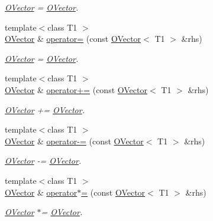 \begin{DoxyCompactItemize}
\begin{DoxyCompactList}\small\item\em \mbox{\hyperlink{classENSEM_1_1OVector}{O\+Vector}} = \mbox{\hyperlink{classENSEM_1_1OVector}{O\+Vector}}. \end{DoxyCompactList}\item 
{\footnotesize template$<$class T1 $>$ }\\\mbox{\hyperlink{classENSEM_1_1OVector}{O\+Vector}} \& \mbox{\hyperlink{classENSEM_1_1OVector_a7d5f2f5a6c1dc742f53cc4dabc86722e}{operator=}} (const \mbox{\hyperlink{classENSEM_1_1OVector}{O\+Vector}}$<$ T1 $>$ \&rhs)
\begin{DoxyCompactList}\small\item\em \mbox{\hyperlink{classENSEM_1_1OVector}{O\+Vector}} = \mbox{\hyperlink{classENSEM_1_1OVector}{O\+Vector}}. \end{DoxyCompactList}\item 
{\footnotesize template$<$class T1 $>$ }\\\mbox{\hyperlink{classENSEM_1_1OVector}{O\+Vector}} \& \mbox{\hyperlink{classENSEM_1_1OVector_a5ecd1c4c6a2e7d9a6a3e5189b3a22ba5}{operator+=}} (const \mbox{\hyperlink{classENSEM_1_1OVector}{O\+Vector}}$<$ T1 $>$ \&rhs)
\begin{DoxyCompactList}\small\item\em \mbox{\hyperlink{classENSEM_1_1OVector}{O\+Vector}} += \mbox{\hyperlink{classENSEM_1_1OVector}{O\+Vector}}. \end{DoxyCompactList}\item 
{\footnotesize template$<$class T1 $>$ }\\\mbox{\hyperlink{classENSEM_1_1OVector}{O\+Vector}} \& \mbox{\hyperlink{classENSEM_1_1OVector_ae8a6c2f30368c6713325d05065aec425}{operator-\/=}} (const \mbox{\hyperlink{classENSEM_1_1OVector}{O\+Vector}}$<$ T1 $>$ \&rhs)
\begin{DoxyCompactList}\small\item\em \mbox{\hyperlink{classENSEM_1_1OVector}{O\+Vector}} -\/= \mbox{\hyperlink{classENSEM_1_1OVector}{O\+Vector}}. \end{DoxyCompactList}\item 
{\footnotesize template$<$class T1 $>$ }\\\mbox{\hyperlink{classENSEM_1_1OVector}{O\+Vector}} \& \mbox{\hyperlink{classENSEM_1_1OVector_ab1d7773b4a23e20961ece98c90b915b4}{operator$\ast$=}} (const \mbox{\hyperlink{classENSEM_1_1OVector}{O\+Vector}}$<$ T1 $>$ \&rhs)
\begin{DoxyCompactList}\small\item\em \mbox{\hyperlink{classENSEM_1_1OVector}{O\+Vector}} $\ast$= \mbox{\hyperlink{classENSEM_1_1OVector}{O\+Vector}}. \end{DoxyCompactList}\item 

\end{DoxyCompactItemize}

